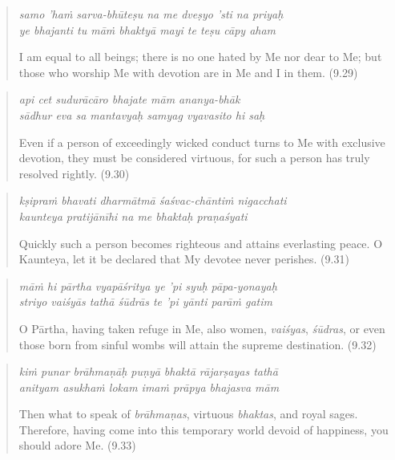 \documentclass[12pt, twoside, openright]{memoir}
\begin{document}
\par
\begin{verse}
\textit{samo ’haṁ sarva-bhūteṣu na me dveṣyo ’sti na priyaḥ} \\
\textit{ye bhajanti tu māṁ bhaktyā mayi te teṣu cāpy aham}

\noindent I am equal to all beings; there is no one hated by Me nor dear to Me; but those who worship Me with devotion are in Me and I in them. (9.29)
\end{verse}
\par



\par
\begin{verse}
\textit{api cet sudurācāro bhajate mām ananya-bhāk} \\
\textit{sādhur eva sa mantavyaḥ samyag vyavasito hi saḥ}

\noindent Even if a person of exceedingly wicked conduct turns to Me with exclusive devotion, they must be considered virtuous, for such a person has truly resolved rightly. (9.30)
\end{verse}
\par



\par
\begin{verse}
\textit{kṣipraṁ bhavati dharmātmā śaśvac-chāntiṁ nigacchati} \\
\textit{kaunteya pratijānīhi na me bhaktaḥ praṇaśyati}

\noindent Quickly such a person becomes righteous and attains everlasting peace. O Kaunteya, let it be declared that My devotee never perishes. (9.31)
\end{verse}
\par



\par
\begin{verse}
\textit{māṁ hi pārtha vyapāśritya ye ’pi syuḥ pāpa-yonayaḥ} \\
\textit{striyo vaiśyās tathā śūdrās te ’pi yānti parāṁ gatim}

\noindent O Pārtha, having taken refuge in Me, also women, \textit{vaiśyas}, \textit{śūdras}, or even those born from sinful wombs will attain the supreme destination. (9.32)
\end{verse}
\par



\par
\begin{verse}
\textit{kiṁ punar brāhmaṇāḥ puṇyā bhaktā rājarṣayas tathā} \\
\textit{anityam asukhaṁ lokam imaṁ prāpya bhajasva mām}

\noindent Then what to speak of \textit{brāhmaṇas}, virtuous \textit{bhaktas}, and royal sages. Therefore, having come into this temporary world devoid of happiness, you should adore Me. (9.33)
\end{verse}
\par
\end{document}
